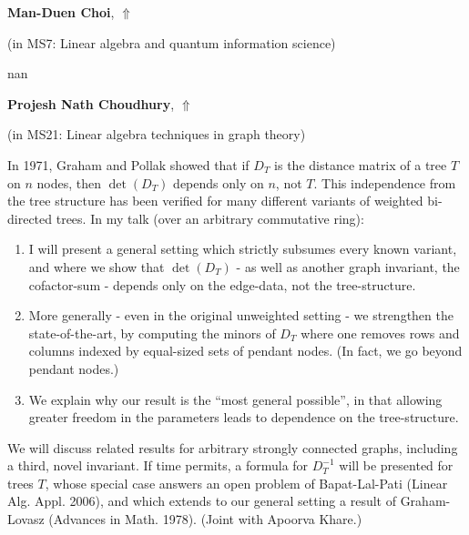 \documentclass[ILAS2025-program.tex]{subfiles}
\begin{document}
     \hypertarget{down0205}{}\begin{ilasabstract}
    
    \textbf{Man-Duen Choi},  \hfill \hyperlink{up0205}{$\Uparrow$}
    
    (in {\color{mstitle}MS7: Linear algebra and quantum information science})
        
        \mtskip
    nan\end{ilasabstract}
     \hypertarget{down0335}{}\begin{ilasabstract}
    
    \textbf{Projesh Nath Choudhury},  \hfill \hyperlink{up0335}{$\Uparrow$}
    
    (in {\color{mstitle}MS21: Linear algebra techniques in graph theory})
        
        \mtskip
    In 1971, Graham and Pollak showed that if $D_T$ is the distance matrix of a tree $T$ on $n$ nodes, then $\det(D_T)$ depends only on $n$, not $T$. This independence from the tree structure has been verified for many different variants of weighted bi-directed trees. In my talk (over an arbitrary commutative ring):
\begin{enumerate}
 \item I will present a general setting which strictly subsumes every known variant, and where we show that $\det(D_T)$ - as well as another graph invariant, the cofactor-sum - depends only on the edge-data, not the tree-structure.
 \item More generally - even in the original unweighted setting - we strengthen the state-of-the-art, by computing the minors of $D_T$ where one removes rows and columns indexed by equal-sized sets of pendant nodes. (In fact, we go beyond pendant nodes.)
 \item We explain why our result is the ``most general possible'', in that allowing greater freedom in the parameters leads to dependence on the tree-structure.
\end{enumerate}
We will discuss related results for arbitrary strongly connected graphs, including a third, novel invariant. If time permits, a formula for  $D_T^{-1}$ will be presented for trees $T$, whose special case answers an open problem of Bapat-Lal-Pati (Linear Alg. Appl. 2006), and which extends to our general setting a result of Graham-Lovasz (Advances in Math. 1978). (Joint with Apoorva Khare.)\end{ilasabstract}
\end{document}
